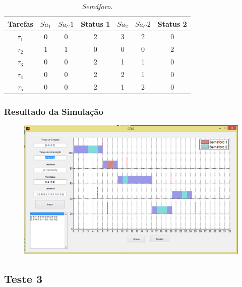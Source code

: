 \begin{table}[H]
\centering
\caption{\em Semáforo.}
\vspace{0.1cm}
\begin{tabular}{c||c|c|c||c|c|c}
 
Tarefas & $Sa_1$ & $Sa_C1$ & Status 1 & $Sa_2$ & $Sa_C2$ & Status 2\\ 
\hline 
                          
$\tau_1$ & 0 & 0 & 2 & 3 & 2 & 0 \\ 
$\tau_2$ & 1 & 1 & 0 & 0 & 0 & 2 \\
$\tau_3$ & 0 & 0 & 2 & 1 & 1 & 0 \\
$\tau_4$ & 0 & 0 & 2 & 2 & 1 & 0 \\
$\tau_5$ & 0 & 0 & 2 & 1 & 2 & 0 

\end{tabular}
\end{table}

\subsubsection{Resultado da Simulação}

\begin{figure}[H]
	\centering
	\includegraphics[keepaspectratio,width=1\textwidth]{img/teste2.png}
\end{figure}



\subsection{Teste 3}
